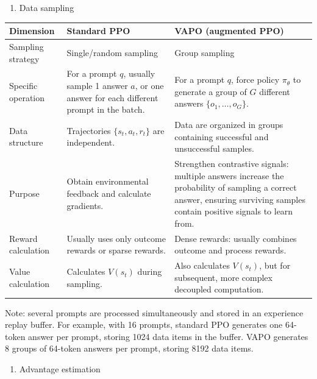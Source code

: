 \begin{enumerate}
\def\labelenumi{\arabic{enumi}.}
\setcounter{enumi}{1}
\tightlist
\item
  Data sampling
\end{enumerate}

\begin{longtable}[]{@{}
  >{\raggedright\arraybackslash}p{}
  >{\raggedright\arraybackslash}p{}
  >{\raggedright\arraybackslash}p{}@{}}
\toprule
Dimension & Standard PPO & VAPO (augmented PPO) \\
\midrule
\endhead
Sampling strategy & Single/random sampling & Group sampling \\
Specific operation & For a prompt \(q\), usually sample 1 answer \(a\), or one answer for each different prompt in the batch. & For a prompt \(q\), force policy \(\pi_\theta\) to generate a group of \(G\) different answers \(\{o_1,\ldots,o_G\}\). \\
Data structure & Trajectories \(\{s_t,a_t,r_t\}\) are independent. & Data are organized in groups containing successful and unsuccessful samples. \\
Purpose & Obtain environmental feedback and calculate gradients. & Strengthen contrastive signals: multiple answers increase the probability of sampling a correct answer, ensuring surviving samples contain positive signals to learn from. \\
Reward calculation & Usually uses only outcome rewards or sparse rewards. & Dense rewards: usually combines outcome and process rewards. \\
Value calculation & Calculates \(V(s_t)\) during sampling. & Also calculates \(V(s_t)\), but for subsequent, more complex decoupled computation. \\
\bottomrule
\end{longtable}

Note: several prompts are processed simultaneously and stored in an experience replay buffer. For example, with 16 prompts, standard PPO generates one 64-token answer per prompt, storing 1024 data items in the buffer. VAPO generates 8 groups of 64-token answers per prompt, storing 8192 data items.

\begin{enumerate}
\def\labelenumi{\arabic{enumi}.}
\setcounter{enumi}{2}
\tightlist
\item
  Advantage estimation
\end{enumerate}

